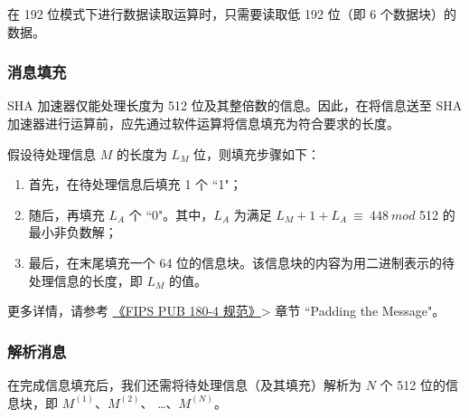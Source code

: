 \documentclass[main\_\_CN.tex]{subfiles}
\begin{document}
\begin{tiplisting}
在 192 位模式下进行数据读取运算时，只需要读取低 192 位（即 6 个数据块）的数据。
\end{tiplisting}

\subsubsection{消息填充}\label{sec:ecdsa-msg-padding}

SHA 加速器仅能处理长度为 512 位及其整倍数的信息。因此，在将信息送至 SHA 加速器进行运算前，应先通过软件运算将信息填充为符合要求的长度。

假设待处理信息 \begin{math} M \end{math} 的长度为 \begin{math}L_M\end{math} 位，则填充步骤如下：

\begin{enumerate}
    \item 首先，在待处理信息后填充 1 个 ``1"；
    \item 随后，再填充 \begin{math}L_A\end{math} 个 ``0"。其中，\begin{math}L_A\end{math} 为满足 \begin{math} L_M + 1 + L_A \ {\equiv} \ 448 \ mod \end{math} 512 的最小非负数解；
    \item 最后，在末尾填充一个 64 位的信息块。该信息块的内容为用二进制表示的待处理信息的长度，即 \begin{math}L_M\end{math} 的值。
\end{enumerate}

更多详情，请参考 \href{https://doi.org/10.6028/NIST.FIPS.180-4}{《FIPS PUB 180-4 规范》}> 章节 ``Padding the Message"。

\subsubsection{解析消息}\label{sec:ecdsa-msg-parsing}

在完成信息填充后，我们还需将待处理信息（及其填充）解析为 \begin{math}N\end{math} 个 512 位的信息块，即 \begin{math}M^{(1)}\end{math}、\begin{math}M^{(2)}\end{math}、 \dots、\begin{math}M^{(N)}\end{math}。
\end{document}
